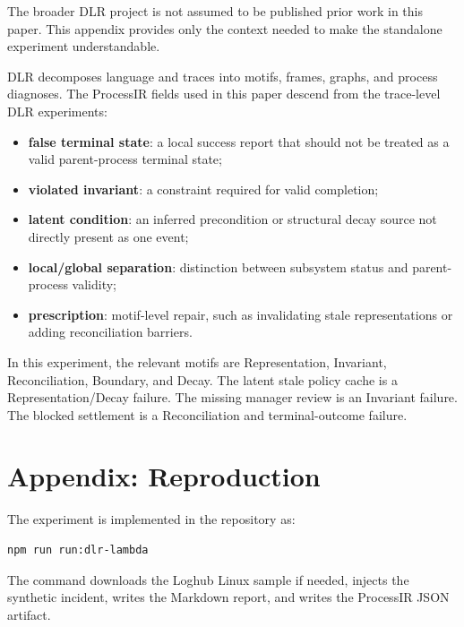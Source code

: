 \documentclass[11pt]{article}
\begin{document}
The broader DLR project is not assumed to be published prior work in this
paper. This appendix provides only the context needed to make the standalone
experiment understandable.

DLR decomposes language and traces into motifs, frames, graphs, and process
diagnoses. The ProcessIR fields used in this paper descend from the trace-level
DLR experiments:

\begin{itemize}
  \item \textbf{false terminal state}: a local success report that should not be
  treated as a valid parent-process terminal state;
  \item \textbf{violated invariant}: a constraint required for valid completion;
  \item \textbf{latent condition}: an inferred precondition or structural decay
  source not directly present as one event;
  \item \textbf{local/global separation}: distinction between subsystem status
  and parent-process validity;
  \item \textbf{prescription}: motif-level repair, such as invalidating stale
  representations or adding reconciliation barriers.
\end{itemize}

In this experiment, the relevant motifs are Representation, Invariant,
Reconciliation, Boundary, and Decay. The latent stale policy cache is a
Representation/Decay failure. The missing manager review is an Invariant
failure. The blocked settlement is a Reconciliation and terminal-outcome failure.

\section{Appendix: Reproduction}

The experiment is implemented in the repository as:

\begin{verbatim}
npm run run:dlr-lambda
\end{verbatim}

The command downloads the Loghub Linux sample if needed, injects the synthetic
incident, writes the Markdown report, and writes the ProcessIR JSON artifact.
\end{document}
